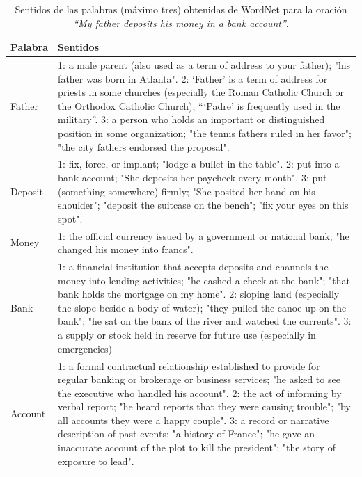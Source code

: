   \begin{table}[t]
    \centering
      \begin{tabular}{|m{2cm}|m{12cm}|}
      \hline
      Palabra & Sentidos\\
      \hline
      \hline
      Father & 1: a male parent (also used as a term of address to your father); "his father was born in Atlanta".
      2: `Father' is a term of address for priests in some churches (especially the Roman Catholic Church or the Orthodox Catholic Church); “`Padre' is frequently used in the military”.
      3: a person who holds an important or distinguished position in some organization; "the tennis fathers ruled in her favor"; "the city fathers endorsed the proposal".\\
      \hline
      Deposit & 1: fix, force, or implant; "lodge a bullet in the table".
      2: put into a bank account; "She deposits her paycheck every month".
      3: put (something somewhere) firmly; "She posited her hand on his shoulder"; "deposit the suitcase on the bench"; "fix your eyes on this spot".\\
      \hline
      Money & 1: the official currency issued by a government or national bank; "he changed his money into francs".  \\
      \hline
      Bank & 1: a financial institution that accepts deposits and channels the money into lending activities; "he cashed a check at the bank"; "that bank holds the mortgage on my home".
      2: sloping land (especially the slope beside a body of water); "they pulled the canoe up on the bank"; "he sat on the bank of the river and watched the currents".
      3: a supply or stock held in reserve for future use (especially in emergencies) \\
      \hline
      Account& 1: a formal contractual relationship established to provide for regular banking or brokerage or business services; "he asked to see the executive who handled his account".
      2: the act of informing by verbal report; "he heard reports that they were causing trouble"; "by all accounts they were a happy couple".
      3: a record or narrative description of past events; "a history of France"; "he gave an inaccurate account of the plot to kill the president"; "the story of exposure to lead".\\
      \hline
    \end{tabular}
    \caption{Sentidos de las palabras (máximo tres) obtenidas de WordNet para la oración \textit{“My father deposits his money in a bank account”}.\cite{001}}
    \label{tab:lesk01}
  \end{table}

